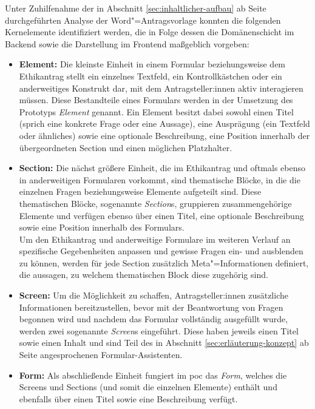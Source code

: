 \documentclass[a4paper,12pt,twoside]{scrreprt}
\begin{document}
Unter Zuhilfenahme der in Abschnitt \ref{sec:inhaltlicher-aufbau} ab Seite \pageref{sec:inhaltlicher-aufbau} durchgeführten Analyse der Word"=Antragsvorlage konnten die folgenden Kernelemente identifiziert werden, die in Folge dessen die Domänenschicht im Backend sowie die Darstellung im Frontend maßgeblich vorgeben:
\begin{itemize}
    \item \textbf{Element:} Die kleinste Einheit in einem Formular beziehungsweise dem Ethikantrag stellt ein einzelnes Textfeld, ein Kontrollkästchen oder ein anderweitiges Konstrukt dar, mit dem Antragsteller:innen aktiv interagieren müssen. Diese Bestandteile eines Formulars werden in der Umsetzung des Prototyps \textit{Element} genannt. Ein Element besitzt dabei sowohl einen Titel (sprich eine konkrete Frage oder eine Aussage), eine Ausprägung (ein Textfeld oder ähnliches) sowie eine optionale Beschreibung, eine Position innerhalb der übergeordneten Section und einen möglichen Platzhalter.
    \item \textbf{Section:} Die nächst größere Einheit, die im Ethikantrag und oftmals ebenso in anderweitigen Formularen vorkommt, sind thematische Blöcke, in die die einzelnen Fragen beziehungsweise Elemente aufgeteilt sind. Diese thematischen Blöcke, sogenannte \textit{Section}s, gruppieren zusammengehörige Elemente und verfügen ebenso über einen Titel, eine optionale Beschreibung sowie eine Position innerhalb des Formulars.\\
    Um den Ethikantrag und anderweitige Formulare im weiteren Verlauf an spezifische Gegebenheiten anpassen und gewisse Fragen ein- und ausblenden zu können, werden für jede Section zusätzlich Meta"=Informationen definiert, die aussagen, zu welchem thematischen Block diese zugehörig sind.
    \item \textbf{Screen:} Um die Möglichkeit zu schaffen, Antragsteller:innen zusätzliche Informationen bereitzustellen, bevor mit der Beantwortung von Fragen begonnen wird und nachdem das Formular vollständig ausgefüllt wurde, werden zwei sogenannte \textit{Screen}s eingeführt. Diese haben jeweils einen Titel sowie einen Inhalt und sind Teil des in Abschnitt \ref{sec:erläuterung-konzept} ab Seite \pageref{sec:erläuterung-konzept} angesprochenen Formular-Assistenten.
    \item \textbf{Form:} Als abschließende Einheit fungiert im \ac{poc} das \textit{Form}, welches die Screens und Sections (und somit die einzelnen Elemente) enthält und ebenfalls über einen Titel sowie eine Beschreibung verfügt.
\end{itemize}
\end{document}
